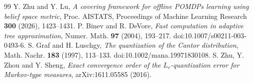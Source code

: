 \begin{thebibliography}{99}
 Y. Zhu and Y. Lu, \emph{A covering framework for offline POMDPs learning using belief space metric}, Proc. AISTATS, Proceedings of Machine Learning Research \textbf{300} (2026), 1423--1431.
 P. Binev and R. DeVore, \emph{Fast computation in adaptive tree approximation}, Numer. Math. \textbf{97} (2004), 193--217. doi:10.1007/s00211-003-0493-6.
 S. Graf and H. Luschgy, \emph{The quantization of the Cantor distribution}, Math. Nachr. \textbf{183} (1997), 113--133. doi:10.1002/mana.19971830108.
 S. Zhu, Y. Zhou and Y. Sheng, \emph{Exact convergence order of the $L_r$-quantization error for Markov-type measures}, arXiv:1611.05585 (2016).
\end{thebibliography}
